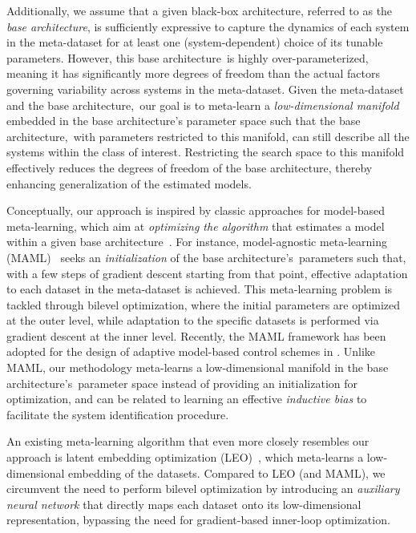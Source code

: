 \documentclass{article}
\newcommand{\base}{{base architecture}}
\begin{document}
Additionally, we assume that a given black-box architecture, referred to as the \emph{\base}, is sufficiently expressive to capture the dynamics of each system in the meta-dataset for at least one (system-dependent) choice of its tunable parameters. However, this \base\ is highly over-parameterized, meaning it has significantly more degrees of freedom than the actual factors governing variability across systems in the meta-dataset.
Given the meta-dataset and the \base,\ our goal is to meta-learn a \emph{low-dimensional manifold} embedded in the \base's parameter space such that the \base,\ with parameters restricted to this manifold, can still describe all the systems within the class of interest.
Restricting the search space to this manifold effectively reduces the degrees of freedom  of the {\base}, thereby enhancing generalization of the estimated models.

Conceptually, our approach is inspired by   classic approaches for {model-based} meta-learning, which aim at \emph{optimizing the algorithm}  that estimates a model within a given \base~\cite{hospedales2021meta}. For instance,  model-agnostic meta-learning (MAML)~\cite{finn2017model} seeks an \emph{initialization} of the \base's\ parameters such that, with a few steps of gradient descent starting from that point, effective adaptation to each dataset in the meta-dataset is achieved. This meta-learning problem is tackled through bilevel optimization, where the initial parameters are optimized at the outer level, while adaptation to the specific datasets is performed via gradient descent at the inner level. Recently, the MAML framework has been adopted for the design of adaptive model-based control schemes in \cite{spencer2023control}.
Unlike MAML, our methodology meta-learns a low-dimensional manifold in the \base's\ parameter space instead of providing an initialization for optimization, and can be related to learning an effective {\it inductive bias} to facilitate the system identification procedure.

An existing meta-learning algorithm that even more closely resembles our approach is latent embedding optimization (LEO)~\cite{rusu2018meta}, which meta-learns a low-dimensional embedding of the datasets. Compared to LEO (and MAML), we circumvent the need to perform bilevel optimization by introducing an \emph{auxiliary neural network} that directly maps each dataset onto its low-dimensional representation, bypassing the need for gradient-based inner-loop optimization.
\end{document}
